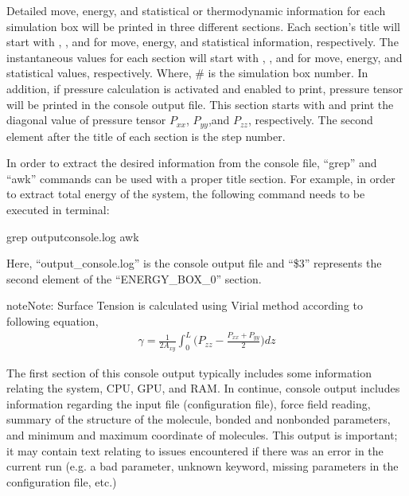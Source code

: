 \documentclass[letterpaper,10pt,english]{sphinxmanual}
\begin{document}
Detailed move, energy, and statistical or thermodynamic information for each simulation box will be printed in
three different sections. Each section’s title will start with , , and  for move,
energy, and statistical information, respectively. The instantaneous values for each section will start with
, , and  for move, energy, and statistical values, respectively. Where, \# is the
simulation box number. In addition, if pressure calculation is activated and enabled to print, pressure tensor
will be printed in the console output file. This section starts with  and print the diagonal value of
pressure tensor \(P_{xx}\), \(P_{yy}\),and \(P_{zz}\), respectively. The second element after the
title of each section is the step number.

In order to extract the desired information from the console file, “grep” and “awk” commands can be used with
a proper title section. For example, in order to extract total energy of the system, the following command needs
to be executed in terminal:

\begin{sphinxVerbatim}[commandchars=\\\{\}]
\PYGZdl{} grep  output\PYGZus{}console.log  awk 
\end{sphinxVerbatim}

Here, “output\_console.log” is the console output file and “\$3” represents the second element of the “ENERGY\_BOX\_0” section.

\begin{sphinxadmonition}{note}{Note:}
Surface Tension is calculated using Virial method according to following equation,
\begin{equation*}
\begin{split}\gamma = \frac{1}{2A_{xy}} \int_{0}^{L} \bigg(P_{zz} - \frac{P_{xx} + P_{yy}}{2} \bigg) dz\end{split}
\end{equation*}\end{sphinxadmonition}

The first section of this console output typically includes some information relating the system, CPU, GPU, and RAM. In continue, console output includes information regarding the input file (configuration file), force field reading, summary of the structure of the molecule, bonded and non\sphinxhyphen{}bonded parameters, and minimum and maximum coordinate of molecules. This output is important; it may contain text relating to issues encountered if there was an error in the current run (e.g. a bad parameter, unknown keyword, missing parameters in the configuration file, etc.)
\end{document}
